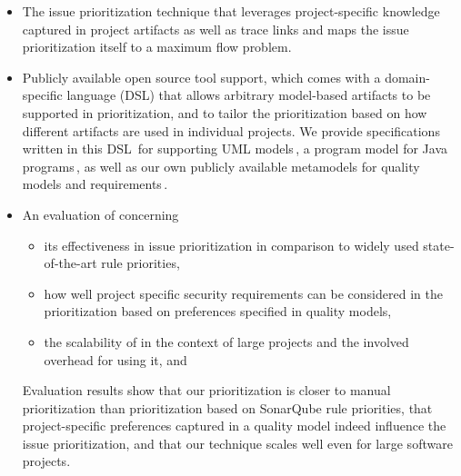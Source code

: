 \begin{itemize}
    \item The \appr{} issue prioritization technique that leverages project-specific knowledge captured in project artifacts as well as trace links and maps the issue prioritization itself to a maximum flow problem.


    \item Publicly available open source tool support, which comes with a domain-specific language (DSL) that allows arbitrary model-based artifacts to be supported in prioritization, and to tailor the prioritization based on how different artifacts are used in individual projects. We provide specifications written in this DSL\,\cite{fowler2010domain,dsl}
    for supporting UML models\,\cite{uml}, a program model for Java programs\,\cite{peldszus2016continuous,Peldszus2022}, as well as our own publicly available metamodels for quality models and requirements\,\cite{replication}.

    \item An evaluation of \appr{} concerning
    \begin{itemize}
        \item its effectiveness in issue prioritization in comparison to widely used state-of-the-art rule priorities,
        \item how well project specific security requirements can be considered in the prioritization based on preferences specified in quality models,
        \item the scalability of \appr{} in the context of large projects and the involved overhead for using it, and
    \end{itemize}

    Evaluation results show that our prioritization is closer to manual prioritization than prioritization based on SonarQube rule priorities, that project-specific preferences captured in a quality model indeed influence the issue prioritization, and that our technique scales well even for large software projects.
\end{itemize}

